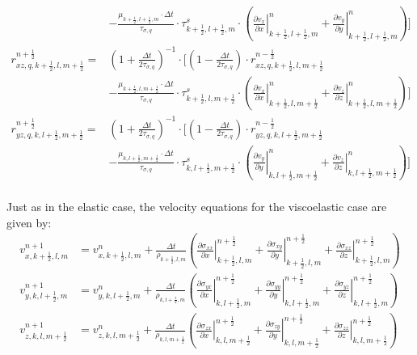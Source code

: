 \documentclass[pdftex,a4paper,parskip,listof=totoc,bibliography=totoc,onehalfspacing,12pt]{scrreprt}
\begin{document}
\begin{align*}
	& -\frac{\mu_{k+\frac{1}{2},l+\frac{1}{2},m}\cdot\Delta t}{\tau_{\sigma,q}}\cdot \tau^s_{k+\frac{1}{2},l+\frac{1}{2},m} \cdot \left( \left.\frac{\partial v_x}{\partial x}\right\rvert_{k+\frac{1}{2},l+\frac{1}{2},m}^{n} + \left.\frac{\partial v_y}{\partial y}\right\rvert_{k+\frac{1}{2},l+\frac{1}{2},m}^{n} \right)\Bigg]\\
	r_{xz,q,k+\frac{1}{2},l,m+\frac{1}{2}}^{n+\frac{1}{2}} =& \left( 1+ \frac{\Delta t}{2\tau_{\sigma,q}} \right)^{-1}\cdot \Bigg[\left( 1- \frac{\Delta t}{2\tau_{\sigma,q}}  \right) \cdot r_{xz,q,k+\frac{1}{2},l,m+\frac{1}{2}}^{n-\frac{1}{2}} \\ 
	& -\frac{\mu_{k+\frac{1}{2},l,m+\frac{1}{2}}\cdot\Delta t}{\tau_{\sigma,q}}\cdot \tau^s_{k+\frac{1}{2},l,m+\frac{1}{2}} \cdot \left( \left.\frac{\partial v_x}{\partial x}\right\rvert_{k+\frac{1}{2},l,m+\frac{1}{2}}^{n} + \left.\frac{\partial v_z}{\partial z}\right\rvert_{k+\frac{1}{2},l,m+\frac{1}{2}}^{n} \right)\Bigg]\\
	r_{yz,q,k,l+\frac{1}{2},m+\frac{1}{2}}^{n+\frac{1}{2}} =& \left( 1+ \frac{\Delta t}{2\tau_{\sigma,q}} \right)^{-1}\cdot \Bigg[\left( 1- \frac{\Delta t}{2\tau_{\sigma,q}}  \right) \cdot r_{yz,q,k,l+\frac{1}{2},m+\frac{1}{2}}^{n-\frac{1}{2}} \\ 
	& -\frac{\mu_{k,l+\frac{1}{2},m+\frac{1}{2}}\cdot\Delta t}{\tau_{\sigma,q}}\cdot \tau^s_{k,l+\frac{1}{2},m+\frac{1}{2}} \cdot \left( \left.\frac{\partial v_y}{\partial y}\right\rvert_{k,l+\frac{1}{2},m+\frac{1}{2}}^{n} + \left.\frac{\partial v_z}{\partial z}\right\rvert_{k,l+\frac{1}{2},m+\frac{1}{2}}^{n} \right)\Bigg] \\
\end{align*}

Just as in the elastic case, the velocity equations for the viscoelastic case are given by:
\begin{align*}
	v_{x,k+\frac{1}{2},l,m}^{n+1} &= v_{x,k+\frac{1}{2},l,m}^n + \frac{\Delta t}{\rho_{k+\frac{1}{2},l,m}}  \left( \left.\frac{\partial\sigma_{xx}}{\partial x}\right\rvert_{k+\frac{1}{2},l,m}^{n+\frac{1}{2}} + \left.\frac{\partial\sigma_{xy}}{\partial y}\right\rvert_{k+\frac{1}{2},l,m}^{n+\frac{1}{2}} + \left.\frac{\partial\sigma_{xz}}{\partial z}\right\rvert_{k+\frac{1}{2},l,m}^{n+\frac{1}{2}} \right)\\
	v_{y,k,l+\frac{1}{2},m}^{n+1} &= v_{y,k,l+\frac{1}{2},m}^n + \frac{\Delta t}{\rho_{k,l+\frac{1}{2},m}}  \left( \left.\frac{\partial\sigma_{yx}}{\partial x}\right\rvert_{k,l+\frac{1}{2},m}^{n+\frac{1}{2}} + \left.\frac{\partial\sigma_{yy}}{\partial y}\right\rvert_{k,l+\frac{1}{2},m}^{n+\frac{1}{2}} + \left.\frac{\partial\sigma_{yz}}{\partial z}\right\rvert_{k,l+\frac{1}{2},m}^{n+\frac{1}{2}} \right)\\
	v_{z,k,l,m+\frac{1}{2}}^{n+1} &= v_{z,k,l,m+\frac{1}{2}}^n + \frac{\Delta t}{\rho_{k,l,m+\frac{1}{2}}}  \left( \left.\frac{\partial\sigma_{zx}}{\partial x}\right\rvert_{k,l,m+\frac{1}{2}}^{n+\frac{1}{2}} + \left.\frac{\partial\sigma_{zy}}{\partial y}\right\rvert_{k,l,m+\frac{1}{2}}^{n+\frac{1}{2}} + \left.\frac{\partial\sigma_{zz}}{\partial z}\right\rvert_{k,l,m+\frac{1}{2}}^{n+\frac{1}{2}} \right)
\end{align*}
\end{document}
